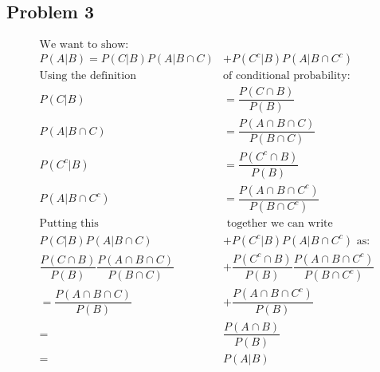 \documentclass{article}
\begin{document}
\begin{flushleft}
\section*{Problem 3}
\begin{align*}
\text{We want to show:}&\\
P(A|B)=P(C|B)P(A|B\cap C)&+P(C^c|B)P(A|B \cap C^c)\\
\text{Using the definition } &\text{of conditional probability:}\\
P(C|B)&=\dfrac{P(C\cap B)}{P(B)}\\
P(A|B\cap C)&=\dfrac{P(A\cap B\cap C)}{P(B\cap C)}\\
P(C^c|B)&=\dfrac{P(C^c\cap B)}{P(B)}\\
P(A|B\cap C^c)&=\dfrac{P(A\cap B\cap C^c)}{P(B\cap C^c)}\\
\text{Putting this}&\text{ together we can write}\\
P(C|B)P(A|B\cap C)&+P(C^c|B)P(A|B \cap C^c) \text{ as:}\\
\dfrac{P(C\cap B)}{P(B)}\dfrac{P(A\cap B\cap C)}{P(B\cap C)}&+
\dfrac{P(C^c\cap B)}{P(B)}\dfrac{P(A\cap B\cap C^c)}{P(B\cap C^c)}\\
=\dfrac{P(A\cap B\cap C)}{P(B)}&+\dfrac{P(A\cap B\cap C^c)}{P(B)}\\
=&\dfrac{P(A\cap B)}{P(B)}\\
=&P(A|B)
\end{align*}

\end{flushleft}
\end{document}
